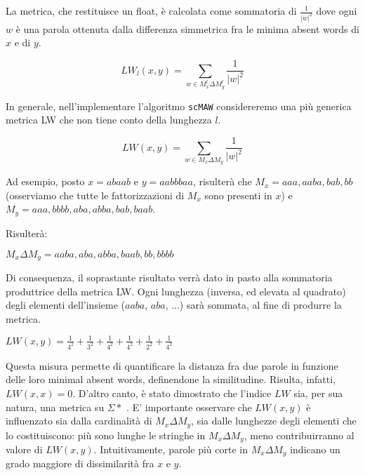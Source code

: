 \vspace{3mm}

La metrica, che restituisce un float, è calcolata come sommatoria di $\frac{1}{|w|^2}$ dove ogni $w$ è una parola ottenuta dalla differenza simmetrica fra le minima absent words di $x$ e di $y$.

\[LW_l (x, y)=\sum_{w \in M^l_x \Delta M^l_y} \frac{1}{|w|^2 }\]

\vspace{3mm}

In generale, nell'implementare l'algoritmo \verb|scMAW| considereremo una più generica metrica LW che non tiene conto della lunghezza $l$.

\[LW (x, y)=\sum_{w \in M_x \Delta M_y} \frac{1}{|w|^2 }\]

Ad esempio, posto $x=abaab$ e $y=aabbbaa$, risulterà che $M_x=aaa, aaba, bab, bb$ (osserviamo che tutte le fattorizzazioni di $M_x$ sono presenti in $x$) e $M_y=aaa,bbbb,aba,abba,bab,baab$.

\vspace{3mm}

Risulterà:

\vspace{3mm}

\(M_x \Delta M_y ={aaba,aba,abba,baab,bb,bbbb}\)

\vspace{3mm}

Di consequenza, il soprastante risultato verrà dato in pasto alla sommatoria produttrice della metrica LW. Ogni lunghezza (inversa, ed elevata al quadrato) degli elementi dell'insieme ($aaba$, $aba$, ...) sarà sommata, al fine di produrre la metrica.

\vspace{3mm}

\(LW(x,y) = \frac{1}{4^2}+\frac{1}{3^2}+\frac{1}{4^2}+\frac{1}{4^2}+\frac{1}{2^2}+\frac{1}{4^2}\)

\vspace{3mm}

Questa misura permette di quantificare la distanza fra due parole in funzione delle loro minimal absent words, definendone la similitudine. Risulta, infatti, $LW(x,x)=0$. D'altro canto, è stato dimostrato che l'indice $LW$ sia, per sua natura, una metrica su $\Sigma*$ \cite{scMAW}. E' importante osservare che $LW(x,y)$ è influenzato sia dalla cardinalità di $M_x \Delta M_y$, sia dalle lunghezze degli elementi che lo costituiscono: più sono lunghe le stringhe in $M_x \Delta M_y$, meno contribuirranno al valore di $LW(x,y)$. Intuitivamente, parole più corte in $M_x \Delta M_y$ indicano un grado maggiore di dissimilarità fra $x$ e $y$.